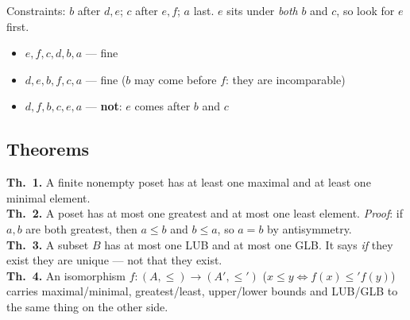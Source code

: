 \documentclass{fkt-notes}
\theoremstyle{definition}
\begin{document}
\begin{example}
  \leavevmode\par\noindent
  \begin{minipage}[c]{0.28\textwidth}
    \centering
  \end{minipage}\hfill
  \begin{minipage}[c]{0.7\textwidth}
    Constraints: $b$ after $d, e$; $c$ after $e, f$; $a$ last.
    $e$ sits under \emph{both} $b$ and $c$, so look for $e$ first.
    \begin{itemize}[nosep]
      \item $e, f, c, d, b, a$ --- fine
      \item $d, e, b, f, c, a$ --- fine ($b$ may come before $f$:
            they are incomparable)
      \item $d, f, b, c, e, a$ --- \textbf{not}: $e$ comes after
            $b$ and $c$
    \end{itemize}
  \end{minipage}
\end{example}

\subsection{Theorems}
\begin{rulebox}[title={6.2 Theorems 1--4}]
  \textbf{Th.~1.} A finite nonempty poset has at least one maximal and
  at least one minimal element.\\
  \textbf{Th.~2.} A poset has at most one greatest and at most one least
  element. \emph{Proof}: if $a,b$ are both greatest, then $a\le b$ and
  $b\le a$, so $a=b$ by antisymmetry.\\
  \textbf{Th.~3.} A subset $B$ has at most one LUB and at most one GLB.
  It says \emph{if} they exist they are unique --- not that they exist.\\
  \textbf{Th.~4.} An isomorphism $f:(A,\le)\to(A',\le')$
  ($x\le y\iff f(x)\le' f(y)$) carries maximal/minimal,
  greatest/least, upper/lower bounds and LUB/GLB to the same thing on
  the other side.
\end{rulebox}
\end{document}
